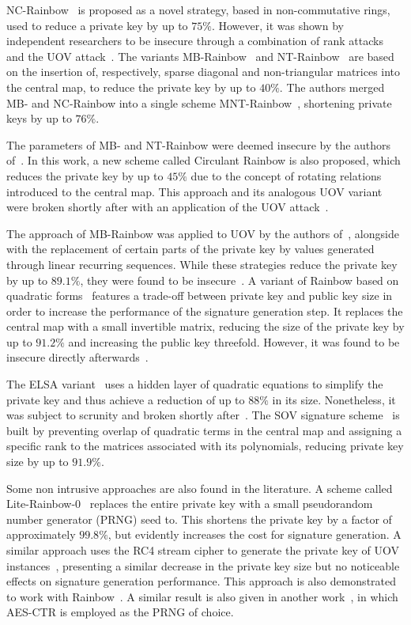 \documentclass[draft, 12pt, a4paper, oneside]{memoir}
\begin{document}
NC-Rainbow~\cite{Yasuda:201202} is proposed as a novel strategy, based in non-commutative rings, used to reduce a private key by up to $75\%$. However, it was shown by independent researchers to be insecure through a combination of rank attacks and the UOV attack~\cite{Thomae:201209,Hashimoto:201302}. The variants MB-Rainbow~\cite{Yasuda:201305} and NT-Rainbow~\cite{Yasuda:201404} are based on the insertion of, respectively, sparse diagonal and non-triangular matrices into the central map, to reduce the private key by up to $40\%$. The authors merged MB- and NC-Rainbow into a single scheme MNT-Rainbow~\cite{Yasuda:201409}, shortening private keys by up to $76\%$. 

The parameters of MB- and NT-Rainbow were deemed insecure by the authors of~\cite{Peng:201706}. In this work, a new scheme called Circulant Rainbow is also proposed, which reduces the private key by up to $45\%$ due to the concept of rotating relations introduced to the central map. This approach and its analogous UOV variant~\cite{Peng:201803} were broken shortly after with an application of the UOV attack~\cite{Hashimoto:201903}.

The approach of MB-Rainbow was applied to UOV by the authors of~\cite{}, alongside with the replacement of certain parts of the private key by values generated through linear recurring sequences. While these strategies reduce the private key by up to $89.1\%$, they were found to be insecure~\cite{}. A variant of Rainbow based on quadratic forms~\cite{Yasuda:201306} features a trade-off between private key and public key size in order to increase the performance of the signature generation step. It replaces the central map with a small invertible matrix, reducing the size of the private key by up to $91.2\%$ and increasing the public key threefold. However, it was found to be insecure directly afterwards~\cite{}.

The ELSA variant~\cite{} uses a hidden layer of quadratic equations to simplify the private key and thus achieve a reduction of up to $88\%$ in its size. Nonetheless, it was subject to scrunity and broken shortly after~\cite{}. The SOV signature scheme~\cite{} is built by preventing overlap of quadratic terms in the central map and assigning a specific rank to the matrices associated with its polynomials, reducing private key size by up to $91.9\%$.

Some non intrusive approaches are also found in the literature. A scheme called Lite-Rainbow-0~\cite{} replaces the entire private key with a small pseudorandom number generator (PRNG) seed to. This shortens the private key by a factor of approximately $99.8\%$, but evidently increases the cost for signature generation. A similar approach uses the RC4 stream cipher to generate the private key of UOV instances~\cite{}, presenting a similar decrease in the private key size but no noticeable effects on signature generation performance. This approach is also demonstrated to work with Rainbow~\cite{}. A similar result is also given in another work~\cite{}, in which AES-CTR is employed as the PRNG of choice.
\end{document}
